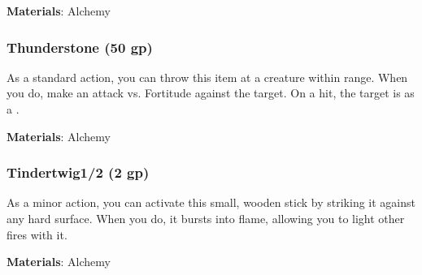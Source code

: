 \vspace{0.25em}
\textbf{Materials}: Alchemy


\lowercase{\hypertarget{item:Thunderstone}{}}\label{item:Thunderstone}
\hypertarget{item:Thunderstone}{\subsubsection{Thunderstone\hfill{} (50 gp)}}

As a standard action, you can throw this item at a creature within \rngclose range.
When you do, make an attack vs. Fortitude against the target.
On a hit, the target is  as a .



\vspace{0.25em}
\textbf{Materials}: Alchemy


\lowercase{\hypertarget{item:Tindertwig}{}}\label{item:Tindertwig}
\hypertarget{item:Tindertwig}{\subsubsection{Tindertwig\hfill1/2 (2 gp)}}

As a minor action, you can activate this small, wooden stick by striking it against any hard surface.
When you do, it bursts into flame, allowing you to light other fires with it.



\vspace{0.25em}
\textbf{Materials}: Alchemy
